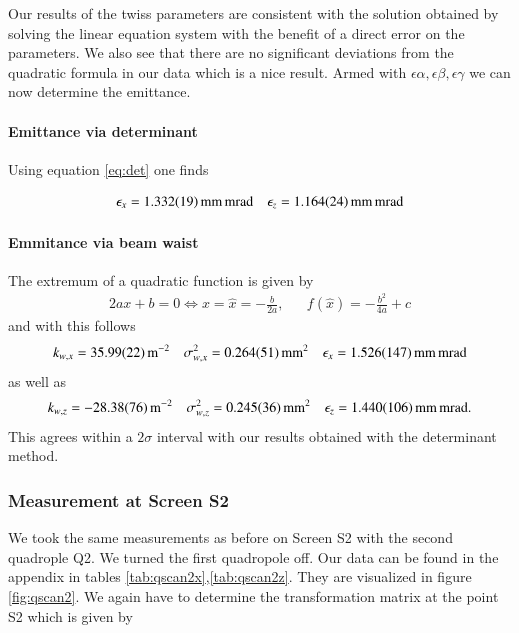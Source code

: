 \documentclass[11pt,a4paper,notitlepage]{scrartcl}
\begin{document}
Our results of the twiss parameters are consistent with the solution obtained by solving the linear equation system with the benefit of a direct error on the parameters. We also see that there are no significant deviations from the quadratic formula in our data which is a nice result. Armed with $\epsilon\alpha,\epsilon\beta,\epsilon\gamma$ we can now determine the emittance.
\paragraph{Emittance via determinant}

Using equation \eqref{eq:det} one finds 

\begin{align*}
	\epsilon_x=\SI{1.332\pm0.019}{\milli\m\milli\radian} && \epsilon_z=\SI{1.164\pm0.024}{\milli\m\milli\radian}
\end{align*} 
\paragraph{Emmitance via beam waist}

The extremum of a quadratic function is given by \begin{align*}
	2ax+b=0\Leftrightarrow x=\hat{x}=-\frac{b}{2a}, && f(\hat{x})=-\frac{b^2}{4a}+c
\end{align*} and with this follows \begin{align*}
k_{w,x}=\SI{35.99 \pm 0.22 }{\m^{-2}}  &&\sigma_{w,x}^2=\SI{0.264\pm0.051}{\milli\m^2} && \epsilon_{x}=\SI{1.526\pm0.147}{\milli\m\milli\radian}
\end{align*}
as well as 
\begin{align*}
	k_{w,z}=\SI{-28.38 \pm 0.76 }{\m^{-2}}  &&\sigma_{w,z}^2=\SI{0.245\pm0.036}{\milli\m^2} && \epsilon_{z}=\SI{1.440\pm0.106}{\milli\m\milli\radian}.
\end{align*}
This agrees within a $2\sigma$ interval with our results obtained with the determinant method.


\subsubsection{Measurement at Screen S2}
We took the same measurements as before on Screen S2 with the second quadrople Q2. We turned the first quadropole off. Our data can be found in the appendix in tables \ref{tab:qscan2x},\ref{tab:qscan2z}. They are visualized in figure \ref{fig:qscan2}. We again have to determine the transformation matrix at the point S2 which is given by
\end{document}
